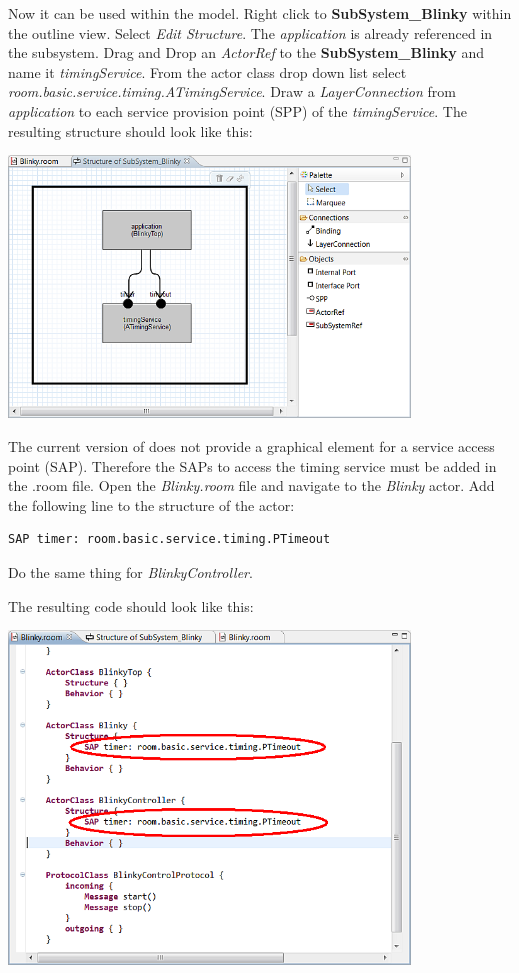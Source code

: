 Now it can be used within the model. Right click to \textbf{SubSystem\_Blinky} within the outline view. 
Select \textit{Edit Structure}. The \textit{application} is already referenced in the subsystem. Drag and 
Drop an \textit{ActorRef} to the \textbf{SubSystem\_Blinky} and name it \textit{timingService}. From the 
actor class drop down list select \textit{room.basic.service.timing.ATimingService}. Draw a 
\textit{LayerConnection} from \textit{application} to each service provision point (SPP) of the 
\textit{timingService}. The resulting structure should look like this:

\includegraphics[width=0.8\textwidth]{images/020-Blinky06.png}

The current version of \eTrice{} does not provide a graphical element for a service access point (SAP). 
Therefore the SAPs to access the timing service must be added in the .room file. Open the 
\textit{Blinky.room} file and navigate to the \textit{Blinky} actor. Add the following line to the 
structure of the actor:

\begin{verbatim}SAP timer: room.basic.service.timing.PTimeout \end{verbatim}

Do the same thing for \textit{BlinkyController}.

The resulting code should look like this:

\includegraphics[width=0.8\textwidth]{images/020-Blinky07.png}


